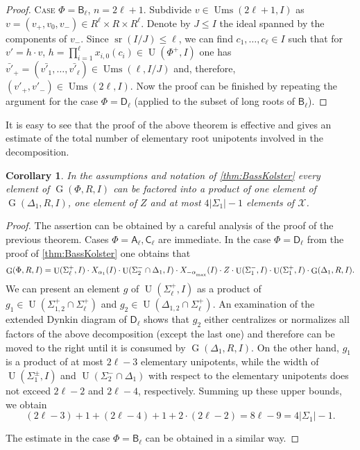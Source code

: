 \documentclass[11pt]{amsart}
\theoremstyle{plain}
\numberwithin{equation}{section}
\numberwithin{lemma}{section}
\newtheorem{cor}[lemma]{Corollary}
\theoremstyle{definition}
\theoremstyle{remark}
\DeclareMathOperator{\G}{G}
\DeclareMathOperator{\U}{U}
\DeclareMathOperator{\sr}{sr}
\DeclareMathOperator{\Ums}{Ums}
\newcommand{\rA}{\mathsf{A}}
\newcommand{\rB}{\mathsf{B}}
\newcommand{\rC}{\mathsf{C}}
\newcommand{\rD}{\mathsf{D}}
\def\ssub#1{\mathchoice
   {_{\lower2pt\hbox{$\scriptstyle #1$}}}
   {_{\lower2pt\hbox{$\scriptstyle #1$}}}
   {_{\lower1.5pt\hbox{$\scriptscriptstyle #1$}}}
   {_{\!\lower1.5pt\hbox{$\scriptscriptstyle #1$}}}}
\begin{document}
\begin{proof}
\textsc{Case $\Phi=\rB_\ell$, $n=2\ell+1$.} Subdivide $v\in \Ums(2\ell+1, I)$ as $v=(v_+, v_0, v_-)\in R^\ell\times R\times R^\ell$.
Denote by $J\leqslant I$ the ideal spanned by the components of $v_-$.
Since $\sr(I/J)\leqslant \ell$, we can find $c_1, \dots, c_\ell\in I$ such that for $v' = h \cdot v$, $h = \prod_{i=1}^\ell x_{i, 0}(c_i) \in \U(\Phi^+, I)$
one has $\bar{v'}_+=(\bar{v'_1}, \ldots, \bar{v'_\ell}) \in \Ums(\ell, I/J)$ and, therefore, $(v'_+, v'_-) \in \Ums(2\ell, I)$.
Now the proof can be finished by repeating the argument for the case $\Phi=\rD_\ell$ (applied to the subset of long roots of $\rB_\ell$).
\end{proof}

It is easy to see that the proof of the above theorem is effective and gives an estimate of the total number of elementary root unipotents involved in the decomposition.
\begin{cor}\label{cor:bass-kolster-count}
In the assumptions and notation of \cref{thm:BassKolster} every element of $\G(\Phi, R, I)$ 
can be factored into a product of one element of $\G(\Delta_1, R, I)$, one element of $Z$ and at most $4|\Sigma_1|-1$ elements of $\mathcal{X}$.
\end{cor}
\begin{proof}
The assertion can be obtained by a careful analysis of the proof of the previous theorem.
Cases $\Phi=\rA_\ell, \rC_\ell$ are immediate.
In the case $\Phi=\rD_\ell$ from the proof of \cref{thm:BassKolster} one obtains that
\begin{equation*} \G(\Phi, R, I) =  \U(\Sigma_\ell^+, I) \cdot X_{\alpha_1}(I) \cdot \U(\Sigma_2^-\cap\Delta_1, I) \cdot X_{-\alpha\ssub{\mathrm{max}}}(I) \cdot Z \cdot \U(\Sigma_1^-, I) \cdot \U(\Sigma_1^+, I) \cdot \G(\Delta_1, R, I). \end{equation*}
We can present an element $g$ of $\U(\Sigma_\ell^+, I)$ as a product of $g_1 \in \U(\Sigma_{1, 2}^+ \cap \Sigma_\ell^+)$ and $g_2\in \U(\Delta_{1, 2}\cap \Sigma_\ell^+)$.
An examination of the extended Dynkin diagram of $\rD_\ell$ shows that $g_2$ either centralizes or normalizes all factors of the above decomposition (except the last one)
and therefore can be moved to the right until it is consumed by $\G(\Delta_1, R, I)$.
On the other hand, $g_1$ is a product of at most $2\ell-3$ elementary unipotents, while the width of $\U(\Sigma_1^\pm, I)$ and $\U(\Sigma_2^-\cap\Delta_1)$ with respect to the elementary unipotents does not exceed $2\ell-2$ and $2\ell-4$, respectively.
Summing up these upper bounds, we obtain
$$(2\ell-3) + 1 + (2\ell - 4) + 1 + 2\cdot (2\ell - 2) = 8\ell - 9 = 4|\Sigma_1| - 1.$$

The estimate in the case $\Phi=\rB_\ell$ can be obtained in a similar way. \end{proof}
\end{document}
